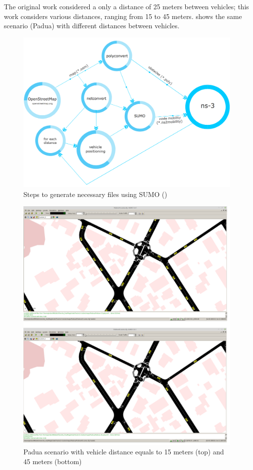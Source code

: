 	The original work considered a only a distance of 25 meters between vehicles; this work considers various distances, ranging from 15 to 45 meters.   shows the same scenario (Padua) with different distances between vehicles.
	
	\begin{figure}[H]
		\centering
		\includegraphics[width=\textwidth]{immagini/sumo-process}
		\caption{Steps to generate necessary files using SUMO (\cite{ROM2017})}
		\label{fig:sumo-process}
	\end{figure}
	
	\begin{figure}[H]
		\centering
		\includegraphics[width=\textwidth]{immagini/sumo-distances}
		\caption{Padua scenario with vehicle distance equals to 15 meters (top) and 45 meters (bottom)}
		\label{fig:sumo-distances}
	\end{figure}
